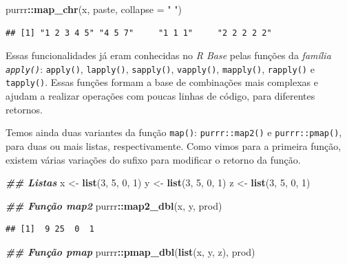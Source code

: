 \documentclass[
]{article}
\newenvironment{Shaded}{\begin{snugshade}}{\end{snugshade}}
\newcommand{\AttributeTok}[1]{\textcolor[rgb]{0.13,0.29,0.53}{#1}}
\newcommand{\DecValTok}[1]{\textcolor[rgb]{0.00,0.00,0.81}{#1}}
\newcommand{\DocumentationTok}[1]{\textcolor[rgb]{0.56,0.35,0.01}{\textbf{\textit{#1}}}}
\newcommand{\FunctionTok}[1]{\textcolor[rgb]{0.13,0.29,0.53}{\textbf{#1}}}
\newcommand{\NormalTok}[1]{#1}
\newcommand{\OtherTok}[1]{\textcolor[rgb]{0.56,0.35,0.01}{#1}}
\newcommand{\SpecialCharTok}[1]{\textcolor[rgb]{0.81,0.36,0.00}{\textbf{#1}}}
\newcommand{\StringTok}[1]{\textcolor[rgb]{0.31,0.60,0.02}{#1}}
\begin{document}
\begin{Shaded}
\begin{Highlighting}[]
\NormalTok{purrr}\SpecialCharTok{::}\FunctionTok{map\_chr}\NormalTok{(x, paste, }\AttributeTok{collapse =} \StringTok{" "}\NormalTok{)}
\end{Highlighting}
\end{Shaded}

\begin{verbatim}
## [1] "1 2 3 4 5" "4 5 7"     "1 1 1"     "2 2 2 2 2"
\end{verbatim}

Essas funcionalidades já eram conhecidas no \emph{R Base} pelas funções da \emph{família \texttt{apply()}}: \texttt{apply()}, \texttt{lapply()}, \texttt{sapply()}, \texttt{vapply()}, \texttt{mapply()}, \texttt{rapply()} e \texttt{tapply()}. Essas funções formam a base de combinações mais complexas e ajudam a realizar operações com poucas linhas de código, para diferentes retornos.

Temos ainda duas variantes da função \texttt{map()}: \texttt{purrr::map2()} e \texttt{purrr::pmap()}, para duas ou mais listas, respectivamente. Como vimos para a primeira função, existem várias variações do sufixo para modificar o retorno da função.

\begin{Shaded}
\begin{Highlighting}[]
\DocumentationTok{\#\# Listas}
\NormalTok{x }\OtherTok{\textless{}{-}} \FunctionTok{list}\NormalTok{(}\DecValTok{3}\NormalTok{, }\DecValTok{5}\NormalTok{, }\DecValTok{0}\NormalTok{, }\DecValTok{1}\NormalTok{)}
\NormalTok{y }\OtherTok{\textless{}{-}} \FunctionTok{list}\NormalTok{(}\DecValTok{3}\NormalTok{, }\DecValTok{5}\NormalTok{, }\DecValTok{0}\NormalTok{, }\DecValTok{1}\NormalTok{)}
\NormalTok{z }\OtherTok{\textless{}{-}} \FunctionTok{list}\NormalTok{(}\DecValTok{3}\NormalTok{, }\DecValTok{5}\NormalTok{, }\DecValTok{0}\NormalTok{, }\DecValTok{1}\NormalTok{)}

\DocumentationTok{\#\# Função map2}
\NormalTok{purrr}\SpecialCharTok{::}\FunctionTok{map2\_dbl}\NormalTok{(x, y, prod)}
\end{Highlighting}
\end{Shaded}

\begin{verbatim}
## [1]  9 25  0  1
\end{verbatim}

\begin{Shaded}
\begin{Highlighting}[]
\DocumentationTok{\#\# Função pmap}
\NormalTok{purrr}\SpecialCharTok{::}\FunctionTok{pmap\_dbl}\NormalTok{(}\FunctionTok{list}\NormalTok{(x, y, z), prod)}
\end{Highlighting}
\end{Shaded}
\end{document}
